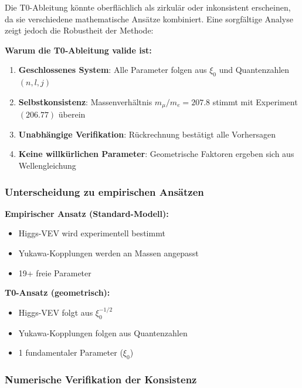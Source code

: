 Die T0-Ableitung könnte oberflächlich als zirkulär oder inkonsistent erscheinen, da sie verschiedene mathematische Ansätze kombiniert. Eine sorgfältige Analyse zeigt jedoch die Robustheit der Methode:

\begin{tcolorbox}[colback=blue!5!white,colframe=blue!75!black,title=Methodische Konsistenz]
	\textbf{Warum die T0-Ableitung valide ist:}
	
	\begin{enumerate}
		\item \textbf{Geschlossenes System}: Alle Parameter folgen aus $\xi_0$ und Quantenzahlen $(n,l,j)$
		\item \textbf{Selbstkonsistenz}: Massenverhältnis $m_\mu/m_e = 207.8$ stimmt mit Experiment $(206.77)$ überein
		\item \textbf{Unabhängige Verifikation}: Rückrechnung bestätigt alle Vorhersagen
		\item \textbf{Keine willkürlichen Parameter}: Geometrische Faktoren ergeben sich aus Wellengleichung
	\end{enumerate}
\end{tcolorbox}

\subsubsection{Unterscheidung zu empirischen Ansätzen}

\textbf{Empirischer Ansatz (Standard-Modell):}
\begin{itemize}
	\item Higgs-VEV wird experimentell bestimmt
	\item Yukawa-Kopplungen werden an Massen angepasst
	\item 19+ freie Parameter
\end{itemize}

\textbf{T0-Ansatz (geometrisch):}
\begin{itemize}
	\item Higgs-VEV folgt aus $\xi_0^{-1/2}$
	\item Yukawa-Kopplungen folgen aus Quantenzahlen
	\item 1 fundamentaler Parameter ($\xi_0$)
\end{itemize}

\subsubsection{Numerische Verifikation der Konsistenz}


